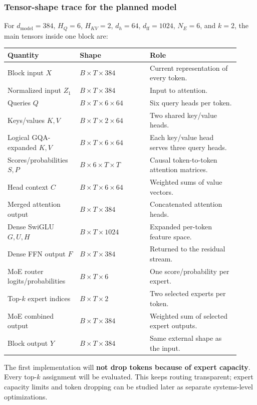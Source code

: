 \documentclass[11pt]{article}
\begin{document}
\subsubsection{Tensor-shape trace for the planned model}
For $d_{\mathrm{model}}=384$, $H_Q=6$, $H_{KV}=2$, $d_h=64$,
$d_{\mathrm{ff}}=1024$, $N_E=6$, and $k=2$, the main tensors inside one block are:

\begin{center}
\small
\begin{tabular}{p{0.27\linewidth} p{0.29\linewidth} p{0.36\linewidth}}
\toprule
\textbf{Quantity} & \textbf{Shape} & \textbf{Role} \\
\midrule
Block input $X$ & $B\times T\times384$ & Current representation of every token. \\
Normalized input $Z_1$ & $B\times T\times384$ & Input to attention. \\
Queries $Q$ & $B\times T\times6\times64$ & Six query heads per token. \\
Keys/values $K,V$ & $B\times T\times2\times64$ & Two shared key/value heads. \\
Logical GQA-expanded $K,V$ & $B\times T\times6\times64$ & Each key/value head serves three query heads. \\
Scores/probabilities $S,P$ & $B\times6\times T\times T$ & Causal token-to-token attention matrices. \\
Head context $C$ & $B\times T\times6\times64$ & Weighted sums of value vectors. \\
Merged attention output & $B\times T\times384$ & Concatenated attention heads. \\
Dense SwiGLU $G,U,H$ & $B\times T\times1024$ & Expanded per-token feature space. \\
Dense FFN output $F$ & $B\times T\times384$ & Returned to the residual stream. \\
MoE router logits/probabilities & $B\times T\times6$ & One score/probability per expert. \\
Top-$k$ expert indices & $B\times T\times2$ & Two selected experts per token. \\
MoE combined output & $B\times T\times384$ & Weighted sum of selected expert outputs. \\
Block output $Y$ & $B\times T\times384$ & Same external shape as the input. \\
\bottomrule
\end{tabular}
\end{center}

The first implementation will \textbf{not drop tokens because of expert capacity}.
Every top-$k$ assignment will be evaluated. This keeps routing transparent; expert
capacity limits and token dropping can be studied later as separate systems-level
optimizations.
\end{document}

